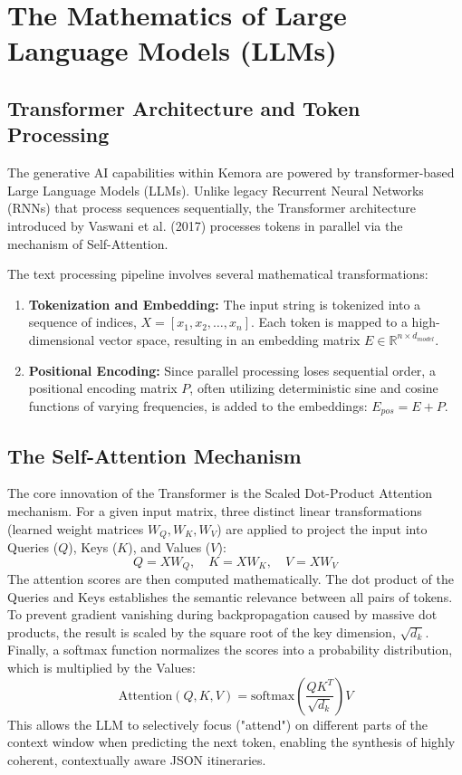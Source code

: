 \section{The Mathematics of Large Language Models (LLMs)}
\subsection{Transformer Architecture and Token Processing}
The generative AI capabilities within Kemora are powered by transformer-based Large Language Models (LLMs). Unlike legacy Recurrent Neural Networks (RNNs) that process sequences sequentially, the Transformer architecture introduced by Vaswani et al. (2017) processes tokens in parallel via the mechanism of Self-Attention.

The text processing pipeline involves several mathematical transformations:
\begin{enumerate}
    \item \textbf{Tokenization and Embedding:} The input string is tokenized into a sequence of indices, $X = [x_1, x_2, \dots, x_n]$. Each token is mapped to a high-dimensional vector space, resulting in an embedding matrix $E \in \mathbb{R}^{n \times d_{model}}$.
    \item \textbf{Positional Encoding:} Since parallel processing loses sequential order, a positional encoding matrix $P$, often utilizing deterministic sine and cosine functions of varying frequencies, is added to the embeddings: $E_{pos} = E + P$.
\end{enumerate}

\subsection{The Self-Attention Mechanism}
The core innovation of the Transformer is the Scaled Dot-Product Attention mechanism. For a given input matrix, three distinct linear transformations (learned weight matrices $W_Q, W_K, W_V$) are applied to project the input into Queries ($Q$), Keys ($K$), and Values ($V$):
$$ Q = X W_Q, \quad K = X W_K, \quad V = X W_V $$
The attention scores are then computed mathematically. The dot product of the Queries and Keys establishes the semantic relevance between all pairs of tokens. To prevent gradient vanishing during backpropagation caused by massive dot products, the result is scaled by the square root of the key dimension, $\sqrt{d_k}$. Finally, a softmax function normalizes the scores into a probability distribution, which is multiplied by the Values:
$$ \text{Attention}(Q, K, V) = \text{softmax}\left(\frac{QK^T}{\sqrt{d_k}}\right)V $$
This allows the LLM to selectively focus ("attend") on different parts of the context window when predicting the next token, enabling the synthesis of highly coherent, contextually aware JSON itineraries.

